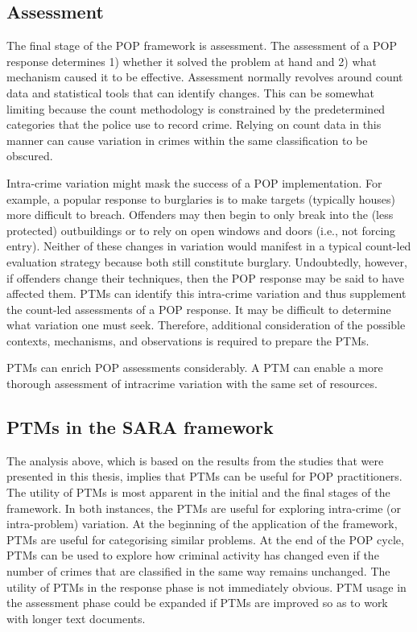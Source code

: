   
\subsection{Assessment}The final stage of the POP framework is assessment. The assessment of a POP response determines 1) whether it solved the problem at hand and 2) what mechanism caused it to be effective. Assessment normally revolves around count data and statistical tools that can identify changes. This can be somewhat limiting because the count methodology is constrained by the predetermined categories that the police use to record crime. Relying on count data in this manner can cause variation in crimes within the same classification to be obscured.

Intra-crime variation might mask the success of a POP implementation. For example, a popular response to burglaries is to make targets (typically houses) more difficult to breach. Offenders may then begin to only break into the (less protected) outbuildings or to rely on open windows and doors (i.e., not forcing entry). Neither of these changes in variation would manifest in a typical count-led evaluation strategy because both still constitute burglary. Undoubtedly, however, if offenders change their techniques, then the POP response may be said to have affected them. PTMs can identify this intra-crime variation and thus supplement the count-led assessments of a POP response. It may be difficult to determine what variation one must seek. Therefore, additional consideration of the possible contexts, mechanisms, and observations is required \parencite{pawson1997realistic} to prepare the PTMs.

PTMs can enrich POP assessments considerably. A PTM can enable a more thorough assessment of intracrime variation with the same set of resources.


\subsection{PTMs in the SARA framework} The analysis above, which is based on the results from the studies that were presented in this thesis, implies that PTMs can be useful for POP practitioners. The utility of PTMs is most apparent in the initial and the final stages of the framework. In both instances, the PTMs are useful for exploring intra-crime (or intra-problem) variation. At the beginning of the application of the framework, PTMs are useful for categorising similar problems. At the end of the POP cycle, PTMs can be used to explore how criminal activity has changed even if the number of crimes that are classified in the same way remains unchanged. The utility of PTMs in the response phase is not immediately obvious. PTM usage in the assessment phase could be expanded if PTMs are improved so as to work with longer text documents.

